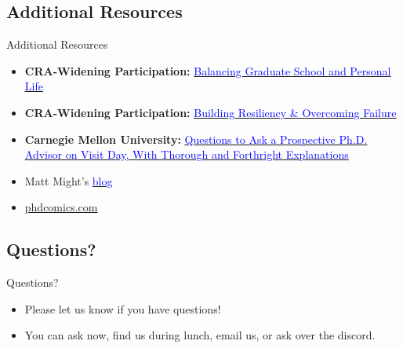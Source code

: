 \documentclass[aspectratio=169]{beamer}
\begin{document}
\subsection{Additional Resources}
\begin{frame}{Additional Resources}
\begin{itemize}
    \item \textbf{CRA-Widening Participation:} \href{https://cra.org/cra-wp/wp-content/uploads/sites/8/2022/03/Balancing-Grad-School-and-Life.pdf}{\underline{\textcolor{blue}{Balancing Graduate School and Personal Life}}}

    \item \textbf{CRA-Widening Participation:} \href{https://acrobat.adobe.com/link/track?uri=urn:aaid:scds:US:8dae44ac-ea20-3fa7-8cac-4f8ceea0d039}{\underline{\textcolor{blue}{Building Resiliency \& Overcoming Failure}}}
    
    \item \textbf{Carnegie Mellon University:} \href{https://blog.ml.cmu.edu/2020/03/02/questions-to-ask-a-prospective-ph-d-advisor-on-visit-day-with-thorough-and-forthright-explanations/}{\underline{\textcolor{blue}{Questions to Ask a Prospective Ph.D. Advisor on}} \underline{\textcolor{blue}{Visit Day, With Thorough and Forthright Explanations}}}
    
    \item Matt Might's \href{https://matt.might.net/articles/}{\underline{\textcolor{blue}{blog}}}

    \item \href{https://phdcomics.com/}{phdcomics.com}

\end{itemize}
\end{frame}

\subsection{Questions?}
\begin{frame}{Questions?}
\begin{itemize}
    \item Please let us know if you have questions!
    \item You can ask now, find us during lunch, email us, or ask over the discord.
\end{itemize}
\end{frame}
\end{document}
